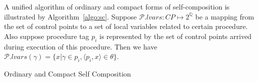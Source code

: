 \documentclass{llncs}
\begin{document}
A unified algorithm of ordinary and compact forms of
self-composition is illustrated by Algorithm~\ref{algo:sc}. Suppose
$\mathcal {P}.lvars:CP\mapsto 2^{\mathbb{Q}}$ be a mapping from the
set of control points to a set of local variables related to certain
procedure. Also suppose procedure tag $p_i$ is represented by the
set of control points arrived during execution of this procedure.
Then we have $\mathcal{P}.lvars(\gamma)=\{x|\gamma \in p_i,\langle
p_i, x\rangle\in\theta\}$.

\begin{algorithm}
\caption{\label{algo:sc} Ordinary and Compact Self Composition}


\end{algorithm}
\end{document}
